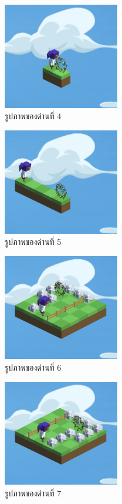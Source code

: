 \begin{figure}[H]
    \begin{center}
    \includegraphics[width=2in]{pic-toro/stage/s4.png}
    \end{center}
    \caption[รูปภาพของด่านที่ 4]{รูปภาพของด่านที่ 4}
    \label{s4}
\end{figure}
\begin{figure}[H]
    \begin{center}
    \includegraphics[width=2in]{pic-toro/stage/s5.png}
    \end{center}
    \caption[รูปภาพของด่านที่ 5]{รูปภาพของด่านที่ 5}
    \label{s5}
\end{figure}
\begin{figure}[H]
    \begin{center}
    \includegraphics[width=2in]{pic-toro/stage/s6.png}
    \end{center}
    \caption[รูปภาพของด่านที่ 6]{รูปภาพของด่านที่ 6}
    \label{s6}
\end{figure}
\begin{figure}[H]
    \begin{center}
    \includegraphics[width=2in]{pic-toro/stage/s7.png}
    \end{center}
    \caption[รูปภาพของด่านที่ 7]{รูปภาพของด่านที่ 7}
    \label{s7}
\end{figure}
